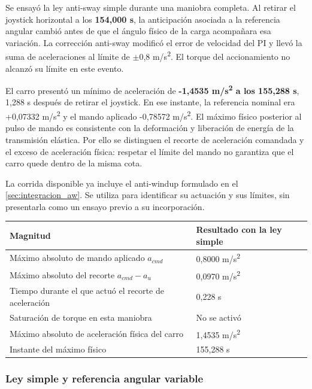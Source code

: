 \documentclass[a4paper,10pt,onecolumn,journal]{ieeeconf}
\numberwithin{equation}{section}
\begin{document}
Se ensayó la ley anti-sway simple durante una maniobra completa. Al retirar el joystick horizontal a los \textbf{154,000 s}, la anticipación asociada a la referencia angular cambió antes de que el ángulo físico de la carga acompañara esa variación. La corrección anti-sway modificó el error de velocidad del PI y llevó la suma de aceleraciones al límite de \(\pm\)0,8 m/s\textsuperscript{2}. El torque del accionamiento no alcanzó su límite en este evento.

El carro presentó un mínimo de aceleración de \textbf{-1,4535 m/s\textsuperscript{2} a los 155,288 s}, 1,288 s después de retirar el joystick. En ese instante, la referencia nominal era +0,07332 m/s\textsuperscript{2} y el mando aplicado -0,78572 m/s\textsuperscript{2}. El máximo físico posterior al pulso de mando es consistente con la deformación y liberación de energía de la transmisión elástica. Por ello se distinguen el recorte de aceleración comandada y el exceso de aceleración física: respetar el límite del mando no garantiza que el carro quede dentro de la misma cota.

La corrida disponible ya incluye el anti-windup formulado en el \cref{sec:integracion_aw}. Se utiliza para identificar su actuación y sus límites, sin presentarla como un ensayo previo a su incorporación.

\begin{table}[H]
\centering
{\small
\begin{tabular}{@{}L{0.64\textwidth}L{0.30\textwidth}@{}}
\toprule
Magnitud & Resultado con la ley simple\\
\midrule
Máximo absoluto de mando aplicado $a_{cmd}$ & 0,8000 m/s\textsuperscript{2}\\
Máximo absoluto del recorte $a_{cmd}-a_u$ & 0,0970 m/s\textsuperscript{2}\\
Tiempo durante el que actuó el recorte de aceleración & 0,228 s\\
Saturación de torque en esta maniobra & No se activó\\
Máximo absoluto de aceleración física del carro & 1,4535 m/s\textsuperscript{2}\\
Instante del máximo físico & 155,288 s\\
\bottomrule
\end{tabular}
}
\end{table}






\subsubsection{Ley simple y referencia angular variable}
\end{document}
